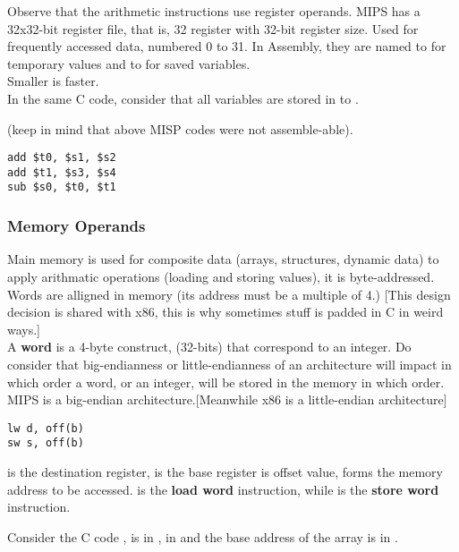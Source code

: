 \documentclass[11pt,a4paper,twocolumn]{book}
\begin{document}
Observe that the arithmetic instructions use register operands. MIPS has a 32x32-bit register file, that is, 32 register with 32-bit register size. Used for frequently accessed data, numbered 0 to 31. In Assembly, they are named  to  for temporary values and  to  for saved variables.\\

Smaller is faster.\\

In the same C code, consider that all variables are stored in  to . 

(keep in mind that above MISP codes were not assemble-able).
\begin{lstlisting}
add $t0, $s1, $s2
add $t1, $s3, $s4
sub $s0, $t0, $t1
\end{lstlisting}

\subsubsection{Memory Operands}

Main memory is used for composite data (arrays, structures, dynamic data) to apply arithmatic operations (loading and storing values), it is byte-addressed. Words are alligned in memory (its address must be a multiple of 4.) [This design decision is shared with x86, this is why sometimes stuff is padded in C in weird ways.]\\

A \textbf{word} is a 4-byte construct, (32-bits) that correspond to an integer. Do consider that big-endianness or little-endianness of an architecture will impact in which order a word, or an integer, will be stored in the memory in which order.\\

MIPS is a big-endian architecture.[Meanwhile x86 is a little-endian architecture] \\

\begin{lstlisting}
lw d, off(b)
sw s, off(b)
\end{lstlisting}

 is the destination register,  is the base register  is offset  value,  forms the memory address to be accessed.  is the \textbf{load word} instruction, while  is the \textbf{store word} instruction.

Consider the C code ,  is in ,  in  and the base address of the  array is in .
\end{document}
